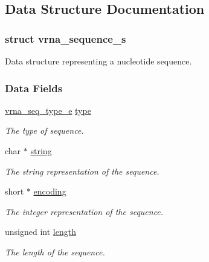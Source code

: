 \subsection{Data Structure Documentation}
\label{structvrna__sequence__s}
\subsubsection{struct vrna\+\_\+sequence\+\_\+s}
Data structure representing a nucleotide sequence. \subsubsection*{Data Fields}
\begin{DoxyCompactItemize}
\item 
\mbox{\label{group__alphabet__utils_aee11f4cc6f792cd36afab3bf7a30ca7b}} 
\mbox{\hyperlink{group__alphabet__utils_ga85cda3fcf5d6bd7ec090d3a96e808609}{vrna\+\_\+seq\+\_\+type\+\_\+e}} \mbox{\hyperlink{group__alphabet__utils_aee11f4cc6f792cd36afab3bf7a30ca7b}{type}}
\begin{DoxyCompactList}\small\item\em The type of sequence. \end{DoxyCompactList}\item 
\mbox{\label{group__alphabet__utils_aa885a2c52b3f87fb6c8f51a77a3430a7}} 
char $\ast$ \mbox{\hyperlink{group__alphabet__utils_aa885a2c52b3f87fb6c8f51a77a3430a7}{string}}
\begin{DoxyCompactList}\small\item\em The string representation of the sequence. \end{DoxyCompactList}\item 
\mbox{\label{group__alphabet__utils_a8010ad82da6766e859e6f25e275a1d89}} 
short $\ast$ \mbox{\hyperlink{group__alphabet__utils_a8010ad82da6766e859e6f25e275a1d89}{encoding}}
\begin{DoxyCompactList}\small\item\em The integer representation of the sequence. \end{DoxyCompactList}\item 
\mbox{\label{group__alphabet__utils_af60876d93312ce0b842574a14c3a9cdd}} 
unsigned int \mbox{\hyperlink{group__alphabet__utils_af60876d93312ce0b842574a14c3a9cdd}{length}}
\begin{DoxyCompactList}\small\item\em The length of the sequence. \end{DoxyCompactList}\end{DoxyCompactItemize}
\label{structvrna__alignment__s}
